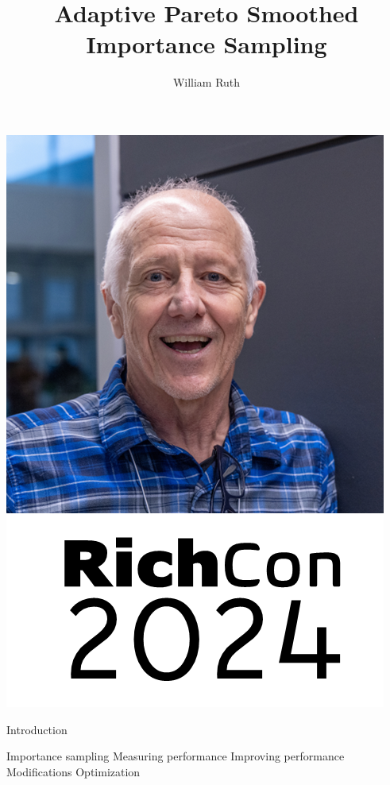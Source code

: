 \documentclass[14pt]{beamer}
\title[]{Adaptive Pareto Smoothed Importance Sampling}
\author{William Ruth}
\institute[]{Joint work with Payman Nickchi}
\date{\vspace{-3cm}}
\begin{document}
\begin{frame}
    \titlepage
\end{frame}

\begin{frame}
    \centering
    \includegraphics[height=0.9\textheight]{Figures/RichCon2.png}
\end{frame}

\begin{frame}{Introduction}
    \begin{outline}
        \1 Importance sampling \newline
        \1 Measuring performance \newline
        \1 Improving performance
            \2 Modifications
            \2 Optimization
    \end{outline}
\end{frame}
\end{document}
